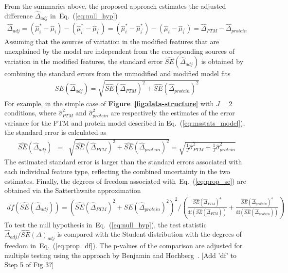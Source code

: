 \documentclass[mcp]{article}
\numberwithin{table}{section}
\def\todo#1{{\color{red}[#1]}}
\def\eqref#1{Eq.~(\ref{eq:#1})}
\def\figref#1{{\bf Figure~\ref{fig:#1}}}
\begin{document}
From the summaries above, the proposed approach estimates the adjusted difference $\hat{\Delta}_{adj}$ in~\eqref{null_hyp}
\begin{eqnarray}
\hat{\Delta}_{adj} = (\hat{\mu}^{\ast}_{i}-\hat{\mu}_{i}) - (\hat{\mu}_{i^{\prime}}^{\ast}-\hat{\mu}_{i^{\prime}}) = (\hat{\mu}^{\ast}_{i}-\hat{\mu}_{i^{\prime}}^{\ast}) - (\hat{\mu}_{i}-\hat{\mu}_{i^{\prime}}) = \hat{\Delta}_{PTM} - \hat{\Delta}_{protein} 
\label{eq:Delta_hat_adj}
\end{eqnarray}
Assuming that the sources of variation in the modified features that are unexplained by the model are independent from the corresponding sources of variation in the modified features, the standard error $\widehat{SE}(\hat{\Delta}_{adj})$ is obtained by combining the standard errors from the unmodified and modified model fits
\begin{eqnarray}
\widehat{SE}(\hat{\Delta}_{adj}) = \sqrt{ \widehat{SE}(\hat{\Delta}_{PTM})^{2} + \widehat{SE}(\hat{\Delta}_{protein})^{2}} 
\label{eq:prop_se}
\end{eqnarray}
For example, in the simple case of \figref{data-structure} with $J=2$ conditions, where $\hat{\sigma}^2_{PTM}$ and $\hat{\sigma}^2_{protein}$ are respectively  the estimates of the error variance for the PTM and protein model described in \eqref{msstats_model}, the standard error is calculated as 
\begin{eqnarray}
 \widehat{SE}(\hat{\Delta}_{adj}) &=& \sqrt{\widehat{SE}(\hat{\Delta}_{PTM})^2 + \widehat{SE}(\hat{\Delta}_{protein})^2} = \sqrt{\frac{1}{J}\hat{\sigma}^2_{PTM} + \frac{1}{J}\hat{\sigma}^2_{protein}}
\label{eq:se_calc}
\end{eqnarray}
The estimated standard error is larger than the standard errors associated with each individual feature type, reflecting the combined uncertainty in the two estimates. 
Finally, the degrees of freedom associated with~\eqref{prop_se} are obtained via the Satterthwaite approximation~\cite{kutner_etal_04a, satterthwaite:1946}
\begin{eqnarray}
df \left(  \widehat{SE}(\hat{\Delta}_{adj}) \right)=  \left( \widehat{SE}(\hat{\Delta}_{PTM})^{2} + \widehat{SE}(\hat{\Delta}_{protein})^{2} \right)^2 \bigg/
\left( \frac{\widehat{SE}(\hat{\Delta}_{PTM})^{4}}{\mathrm{df}(\widehat{SE}(\hat{\Delta}_{PTM}))} + \frac{\widehat{SE}(\hat{\Delta}_{protein})^{4}}{ \mathrm{df}(\widehat{SE}(\hat{\Delta}_{protein}))} \right)
\label{eq:prop_df}
\end{eqnarray}
To test the null hypothesis in~\eqref{null_hyp}, the test statistic $\hat{\Delta}_{adj}/\widehat{SE}(\Delta)_{adj}$ is compared with the Student distribution with the degrees of freedom in~\eqref{prop_df}. The p-values of the comparison are adjusted for multiple testing using the approach by Benjamin and Hochberg~\cite{Benjamini:1995}.
\todo{Add 'df' to Step 5 of Fig 3?}
\end{document}
